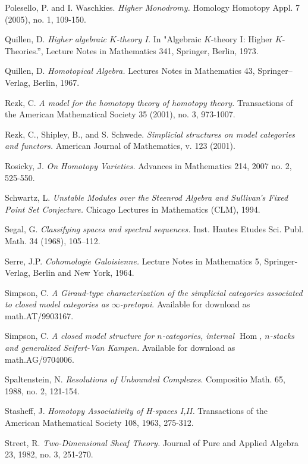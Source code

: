 \documentclass[12pt, final]{report}
\DeclareMathOperator{\Hom}{Hom} \DeclareMathOperator{\bP}{\beta P}
\theoremstyle{definition}
\begin{document}
\begin{thebibliography}{99}
 Polesello, P. and I. Waschkies. {\it Higher Monodromy.} Homology Homotopy Appl. 7 (2005), no. 1, 109-150.

 Quillen, D. {\it Higher algebraic $K$-theory I.} In "Algebraic $K$-theory I: Higher $K$-Theories.'', Lecture Notes in Mathematics 341, Springer, Berlin, 1973.

 Quillen, D. {\it Homotopical Algebra.} Lectures Notes in Mathematics 43, Springer--Verlag, Berlin, 1967. 

 Rezk, C. {\it A model for the homotopy theory of homotopy theory.} Transactions of the American Mathematical Society 35 (2001), no. 3, 973-1007.

 Rezk, C., Shipley, B., and S. Schwede. {\it Simplicial structures on model categories and functors.} American Journal of Mathematics, v. 123 (2001).

 Rosicky, J. {\it On Homotopy Varieties.} Advances in Mathematics
214, 2007 no. 2, 525-550.

 Schwartz, L. {\it Unstable Modules over the Steenrod Algebra and Sullivan's Fixed Point Set Conjecture.} Chicago Lectures in Mathematics (CLM), 1994.

 Segal, G. {\it Classifying spaces and spectral sequences.} 
Inst. Hautes Etudes Sci. Publ. Math. 34 (1968), 105--112. 

 Serre, J.P. {\it Cohomologie Galoisienne.}
Lecture Notes in Mathematics 5, Springer-Verlag, Berlin and New
York, 1964.

 Simpson, C. {\it A Giraud-type characterization of the
simplicial categories associated to closed model categories as
$\infty$-pretopoi}. Available for download as math.AT/9903167.

 Simpson, C. {\it A closed model structure for $n$-categories, internal
$\Hom$, $n$-stacks and generalized Seifert-Van Kampen.} Available for download as
math.AG/9704006.

 Spaltenstein, N. {\it Resolutions of Unbounded
Complexes}. Compositio Math. 65, 1988, no. 2, 121-154.

 Stasheff, J. {\it Homotopy Associativity of
H-spaces I,II.} Transactions of the American Mathematical Society
108, 1963, 275-312.

 Street, R. {\it Two-Dimensional Sheaf Theory.}
Journal of Pure and Applied Algebra 23, 1982, no. 3, 251-270.


\end{thebibliography}
\end{document}
